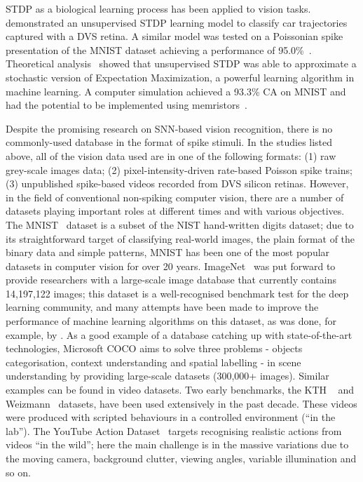 \documentclass{frontiersENG} %
\begin{document}
STDP as a biological learning process has been applied to vision tasks.
\cite{bichler2012extraction} demonstrated an unsupervised STDP learning model to classify car trajectories captured with a DVS retina. 
A similar model was tested on a Poissonian spike presentation of the MNIST dataset achieving a performance of 95.0\%~\citep{diehl2015unsupervised}.
Theoretical analysis~\citep{nessler2013bayesian} showed that unsupervised STDP was able to approximate a stochastic version of Expectation Maximization, a powerful learning algorithm in machine learning.
A computer simulation achieved a 93.3\% CA on MNIST and had the potential to be implemented using memristors~\citep{bill2014compound}. 

Despite the promising research on SNN-based vision recognition, there is no commonly-used database in the format of spike stimuli.
In the studies listed above, all of the vision data used are in one of the following formats:
(1) raw grey-scale images data;
(2) pixel-intensity-driven rate-based Poisson spike trains;
(3) unpublished spike-based videos recorded from DVS silicon retinas.
However, in the field of conventional non-spiking computer vision, there are a number of datasets playing important roles at different times and with various objectives.
The MNIST~\citep{lecun1998gradient} dataset is a subset of the NIST hand-written digits dataset; due to its straightforward target of classifying real-world images, the plain format of the binary data and simple patterns, MNIST has been one of the most popular datasets in computer vision for over 20 years.
ImageNet~\citep{deng2009imagenet} was put forward to provide researchers with a large-scale image database that currently contains 14,197,122 images;
this dataset is a well-recognised benchmark test for the deep learning community, and many attempts have been made to improve the performance of machine learning algorithms on this dataset, as was done, for example, by \citet{krizhevsky2012imagenet}.
As a good example of a database catching up with state-of-the-art technologies, Microsoft COCO aims to solve three problems - objects categorisation, context understanding and spatial labelling - in scene understanding by providing large-scale datasets (300,000+ images).
Similar examples can be found in video datasets.
Two early benchmarks, the KTH ~\citep{schuldt2004recognizing} and Weizmann~\citep{blank2005actions} datasets, have been used extensively in the past decade. 
These videos were produced with scripted behaviours in a controlled environment (``in the lab'').
The YouTube Action Dataset~\citep{liu2009recognizing} targets recognising realistic actions from videos ``in the wild'';
here the main challenge is in the massive variations due to the moving camera, background clutter, viewing angles, variable illumination and so on.
\end{document}
